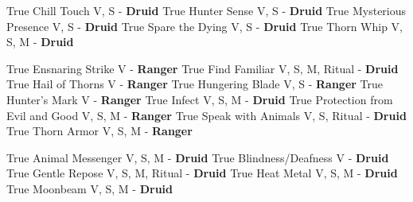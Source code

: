 \documentclass[letterpaper,openany,oneside,twocolumn]{book}
\begin{document}
\onecolumn


\rendercharactersheet

\renderbackgroundsheet

\renderspellsheet

\ResetSpellSheetInput



	{True}
	{Chill Touch}
	{V, S - \textbf{Druid}}
	{True}
	{Hunter Sense}
	{V, S - \textbf{Druid}}
	{True}
	{Mysterious Presence}
	{V, S - \textbf{Druid}}
	{True}
	{Spare the Dying}
	{V, S - \textbf{Druid}}
	{True}
	{Thorn Whip}
	{V, S, M - \textbf{Druid}}
	
	{True}
	{Ensnaring Strike}
	{V - \textbf{Ranger}}
	{True}
	{Find Familiar}
	{V, S, M, Ritual - \textbf{Druid}}
	{True}
	{Hail of Thorns}
	{V - \textbf{Ranger}}
	{True}
	{Hungering Blade}
	{V, S - \textbf{Ranger}}
	{True}
	{Hunter's Mark}
	{V - \textbf{Ranger}}
	{True}
	{Infect}
	{V, S, M - \textbf{Druid}}
	{True}
	{Protection from Evil and Good}
	{V, S, M - \textbf{Ranger}}
	{True}
	{Speak with Animals}
	{V, S, Ritual - \textbf{Druid}}
	{True}
	{Thorn Armor}
	{V, S, M - \textbf{Ranger}}
	
	{True}
	{Animal Messenger}
	{V, S, M - \textbf{Druid}}
	{True}
	{Blindness/Deafness}
	{V - \textbf{Druid}}
	{True}
	{Gentle Repose}
	{V, S, M, Ritual - \textbf{Druid}}
	{True}
	{Heat Metal}
	{V, S, M - \textbf{Druid}}
	{True}
	{Moonbeam}
	{V, S, M - \textbf{Druid}}
	
\end{document}
